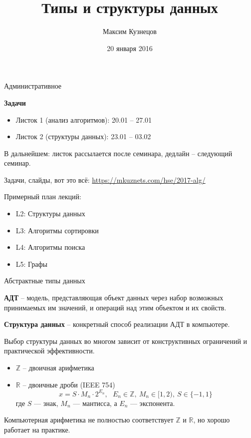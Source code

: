 
\title{Типы и структуры данных}
\author[М. Кузнецов]{Максим Кузнецов}
\date{20 января 2016}

\frame{\titlepage} 


\begin{frame}{Административное}
  
  {\bf Задачи}
  \begin{itemize}
    \item Листок 1 (анализ алгоритмов): 20.01 -- 27.01
    \item Листок 2 (структуры данных): 23.01 -- 03.02
  \end{itemize}

  В дальнейшем: листок рассылается после семинара, дедлайн -- следующий семинар.

  Задачи, слайды, вот это всё: \url{https://mkuznets.com/hse/2017-alg/}

  Примерный план лекций:
  \begin{itemize}
    \item L2: Структуры данных
    \item L3: Алгоритмы сортировки
    \item L4: Алгоритмы поиска
    \item L5: Графы
  \end{itemize}
  
\end{frame}


\begin{frame}{Абстрактные типы данных}
  
  {\bf АДТ} -- модель, представляющая объект данных через набор возможных принимаемых им значений, и операций над этим объектом и их свойств.

  {\bf Структура данных} -- конкретный способ реализации АДТ в компьютере.

  Выбор структуры данных во многом зависит от конструктивных ограничений и практической эффективности.

  \begin{itemize}
    \item $\mathds{Z}$ -- двоичная арифметика
    \item $\mathds{R}$ -- двоичные дроби (IEEE 754)%
      $$
      x = S \cdot M_n \cdot 2^{E_n},~~~ E_n \in \mathbb{Z},~ M_n \in [1, 2),~ S \in \{-1, 1\}
      $$ где $S$ --- знак, $M_n$ --- мантисса, а $E_n$ --- экспонента.
  \end{itemize}

  Компьютерная арифметика не полностью соответствует $\mathds{Z}$ и $\mathds{R}$, но хорошо работает на практике.
  
\end{frame}

